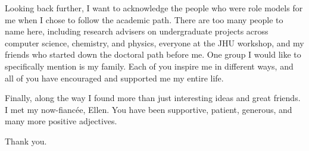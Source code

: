\begin{acknowledgements}
Looking back further, I want to acknowledge the people who were role models for me when I chose to follow the academic path.
There are too many people to name here, including research advisers on undergraduate projects across computer science, chemistry, and physics, everyone at the JHU workshop, and my friends who started down the doctoral path before me.
One group I would like to specifically mention is my family.
Each of you inspire me in different ways, and all of you have encouraged and supported me my entire life.

Finally, along the way I found more than just interesting ideas and great friends.
I met my now-fianc\'{e}e, Ellen.
You have been supportive, patient, generous, and many more positive adjectives.

Thank you.

\end{acknowledgements}
